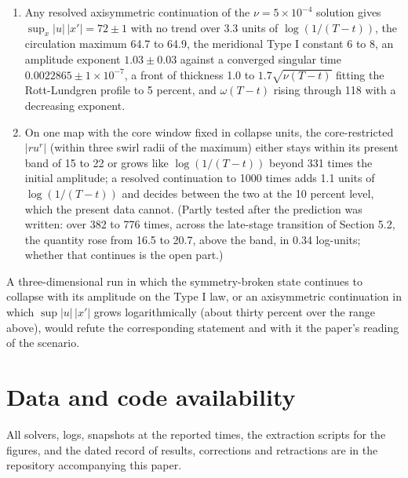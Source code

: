\documentclass[11pt]{article}
\newcommand{\sn}[2]{#1\times 10^{#2}}
\begin{document}
\begin{enumerate}
\item Any resolved axisymmetric continuation of the $\nu = \sn{5}{-4}$ solution gives $\sup_x |u|\,|x'| = 72 \pm 1$ with no trend over 3.3 units of $\log(1/(T - t))$, the circulation maximum 64.7 to 64.9, the meridional Type I constant 6 to 8, an amplitude exponent $1.03 \pm 0.03$ against a converged singular time $0.0022865 \pm \sn{1}{-7}$, a front of thickness 1.0 to $1.7 \sqrt{\nu (T - t)}$ fitting the Rott-Lundgren profile \cite{R58,L82} to 5 percent, and $\omega (T - t)$ rising through 118 with a decreasing exponent.
\item On one map with the core window fixed in collapse units, the core-restricted $|r u^r|$ (within three swirl radii of the maximum) either stays within its present band of 15 to 22 or grows like $\log(1/(T - t))$ beyond 331 times the initial amplitude; a resolved continuation to 1000 times adds 1.1 units of $\log(1/(T - t))$ and decides between the two at the 10 percent level, which the present data cannot. (Partly tested after the prediction was written: over 382 to 776 times, across the late-stage transition of Section 5.2, the quantity rose from 16.5 to 20.7, above the band, in 0.34 log-units; whether that continues is the open part.)
\end{enumerate}

A three-dimensional run in which the symmetry-broken state continues to collapse with its amplitude on the Type I law, or an axisymmetric continuation in which $\sup |u|\,|x'|$ grows logarithmically (about thirty percent over the range above), would refute the corresponding statement and with it the paper's reading of the scenario.

\section*{Data and code availability}

All solvers, logs, snapshots at the reported times, the extraction scripts for the figures, and the dated record of results, corrections and retractions are in the repository accompanying this paper.
\end{document}
